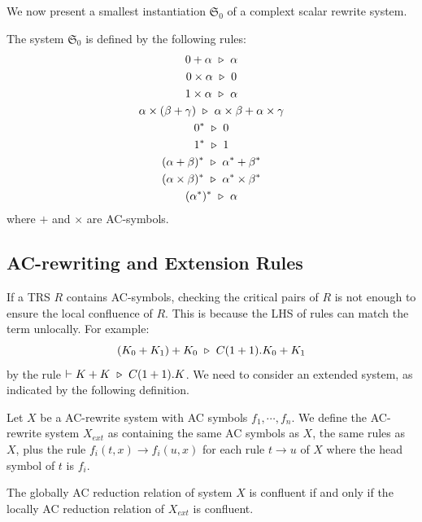 We now present a smallest instantiation $\mathfrak{S}_0$ of a complext scalar rewrite system. 

\begin{definition}
  The system $\mathfrak{S}_0$ is defined by the following rules:
  \begin{gather*}
    0 + \alpha \ \triangleright\  \alpha\\
    0 \times \alpha \ \triangleright\  0\\
    1 \times \alpha \ \triangleright\  \alpha\\
    \alpha \times (\beta + \gamma) \ \triangleright\  \alpha \times \beta + \alpha \times \gamma\\
    0^* \ \triangleright\  0 \\
    1^* \ \triangleright\  1 \\
    (\alpha + \beta)^* \ \triangleright\  \alpha^* + \beta^*\\
    (\alpha \times \beta)^* \ \triangleright\  \alpha^* \times \beta^*\\
    (\alpha^*)^* \ \triangleright\  \alpha
  \end{gather*}
  where $+$ and $\times$ are AC-symbols.
\end{definition}


\subsection{AC-rewriting and Extension Rules}
If a TRS $R$ contains AC-symbols, checking the critical pairs of $R$ is not enough to ensure the local confluence of $R$. This is because the LHS of rules can match the term unlocally. For example:
$$
(K_0 + K_1) + K_0 \ \triangleright\  C(1 + 1).K_0 + K_1
$$
by the rule $\vdash K + K \ \triangleright\  C(1 + 1).K$. We need to consider an extended system, as indicated by the following definition.

\begin{definition}
  Let $X$ be a AC-rewrite system with AC symbols $f_1, \cdots, f_n$. We define the AC-rewrite system $X_{ext}$ as containing the same AC symbols as $X$, the same rules as $X$, plus the rule $f_i(t, x) \to f_i(u, x)$ for each rule $t \to u$ of $X$ where the head symbol of $t$ is $f_i$.
\end{definition}

\begin{proposition}
  The globally AC reduction relation of system $X$ is confluent if and only if the locally AC reduction relation of $X_{ext}$ is confluent.
\end{proposition}

